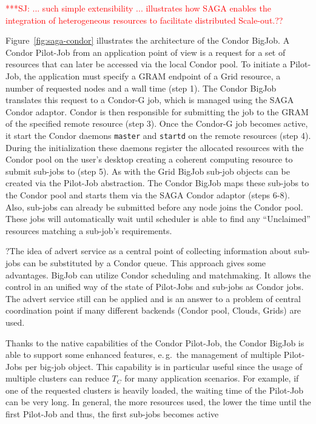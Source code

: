 \documentclass[conference,final]{IEEEtran}
\newcommand{\tc}{$T_{C}$ }
\newcommand{\jhanote}[1]{ {\textcolor{red} { ***SJ: #1 }}}
\newcommand{\jhanote}[1]{}
\begin{document}
\jhanote{... such simple extensibility ... illustrates how SAGA
  enables the integration of heterogeneous resources to facilitate
  distributed Scale-out.??}

Figure~\ref{fig:saga-condor} illustrates the architecture of the Condor BigJob.
A Condor Pilot-Job from an application point of view is a request 
for a set of resources that can later be accessed via the local Condor pool. 
To initiate a Pilot-Job, the application must specify a GRAM endpoint 
of a Grid resource, a number of requested nodes and a wall time (step 1). 
The Condor BigJob translates this request to a Condor-G job, which is managed
using the SAGA Condor adaptor. Condor is then responsible for submitting 
the job to the GRAM of the specified remote resource (step 3). Once the Condor-G
job becomes active, it start the Condor daemons \texttt{master} and \texttt{startd} on 
the remote resources (step 4). During the initialization these 
daemons register the allocated resources with the Condor
pool on the user's desktop creating a coherent computing resource to
submit sub-jobs to (step 5). As with the Grid BigJob sub-job objects
can be created via the Pilot-Job abstraction. The Condor BigJob maps these
sub-jobs to the Condor pool and starts them via the SAGA Condor adaptor (steps 6-8). 
Also, sub-jobs can already be submitted before any node joins the
Condor pool. These jobs will automatically wait until scheduler is able to find any
``Unclaimed'' resources matching a sub-job's requirements. 

?The idea of advert service as a central point of
collecting information about sub-jobs can be substituted by a Condor
queue. This approach gives some advantages.  BigJob can utilize Condor
scheduling and matchmaking. It allows the control in an unified way of
the state of Pilot-Jobs and sub-jobs as Condor jobs. The advert
service still can be applied and is an answer to a problem of central
coordination point if many different backends (Condor pool, Clouds,
Grids) are used. 

Thanks to the native capabilities of the Condor Pilot-Job, the Condor BigJob
is able to support some enhanced features, e.\,g.\ the management
of multiple Pilot-Jobs per big-job object. This capability is in particular
useful since the usage of multiple clusters can reduce \tc for many application
scenarios. For example, if one of the requested clusters is heavily loaded, the
waiting time of the Pilot-Job can be very long. In general, the more resources used, the 
lower the time until the first Pilot-Job and thus, the first sub-jobs becomes
active 
\end{document}
